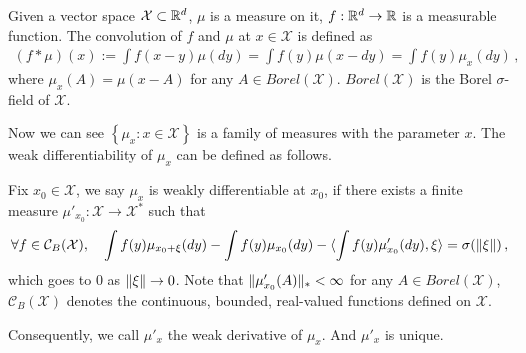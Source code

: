 \documentclass[11pt,letterpaper,english]{article}
\begin{document}
Given a vector space $\mathcal{X} \subset \mathbb{R}^d$, $\mu$ is a measure on it, $f: \mathbb{R}^d \to \mathbb{R}$ is a measurable function. The convolution of 
$f$ and $\mu$ at $x\in \mathcal{X}$ is defined as
\begin{align*}
\left( f*\mu \right) (x) := \int f(x-y)\mu (d y)
= \int f(y)\mu(x-dy) = \int f(y)\mu_x(dy)\,,
\end{align*}
where $\mu_x(A) = \mu(x-A)$ for any $A\in Borel(\mathcal{X})$. $Borel(\mathcal{X})$ is the Borel $\sigma$-field of $\mathcal{X}$.

Now we can see $\left\lbrace \mu_x: x\in \mathcal{X} \right\rbrace$ is a family of measures with the parameter $x$. The weak differentiability of $\mu_x$ can be defined as follows.
\begin{definition}
Fix $x_0 \in \mathcal{X}$, we say $\mu_x$ is weakly differentiable at $x_0$, if there exists a finite measure $\mu'_{x_0}: \mathcal{X}\to \mathcal{X}^*$ such that
\begin{align*}
\forall f \in \mathcal{C}_B(\mathcal{X}), \quad
\int f(y)\mu_{x_0+\xi}(dy) - \int f(y)\mu_{x_0}(dy)
-\langle \int f(y)\mu'_{x_0}(dy), \xi \rangle = \sigma(\|\xi\|) \,,
\end{align*}
which goes to $0$ as $\|\xi\| \to 0$. Note that $\|\mu'_{x_0}(A)\|_*< \infty$ for any $A\in Borel(\mathcal{X})$, $\mathcal{C}_B(\mathcal{X})$ denotes the continuous, bounded, real-valued functions defined on $\mathcal{X}$.
\end{definition}
Consequently, we call $\mu'_x$ the weak derivative of $\mu_x$. And $\mu'_x$ is unique.
\end{document}
